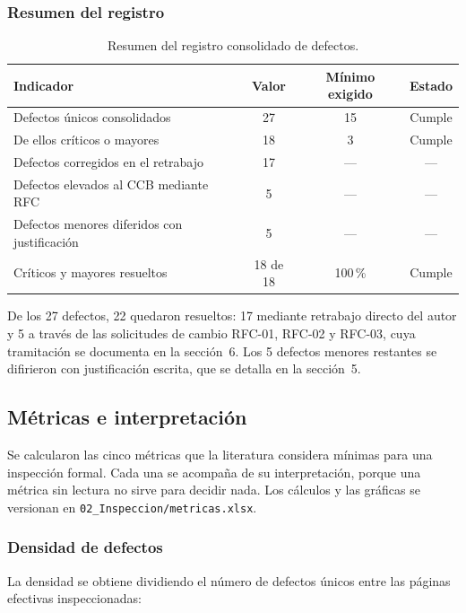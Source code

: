 \documentclass[journal,onecolumn]{IEEEtran}
\begin{document}
	\subsubsection{Resumen del registro}
	
	\begin{table}[h!]
		\centering
		\caption{Resumen del registro consolidado de defectos.}
		\label{tab:resumen-registro}
		\begin{tabular}{
				>{\raggedright\arraybackslash}p{5cm}
				c c c
			}
			\toprule
			\textbf{Indicador} & \textbf{Valor} & \textbf{Mínimo exigido} & \textbf{Estado} \\
			\midrule
			Defectos únicos consolidados & 27 & 15 & Cumple \\
			De ellos críticos o mayores & 18 & 3 & Cumple \\
			Defectos corregidos en el retrabajo & 17 & --- & --- \\
			Defectos elevados al CCB mediante RFC & 5 & --- & --- \\
			Defectos menores diferidos con justificación & 5 & --- & --- \\
			Críticos y mayores resueltos & 18 de 18 & 100\,\% & Cumple \\
			\bottomrule
		\end{tabular}
	\end{table}
	
	De los 27 defectos, 22 quedaron resueltos: 17 mediante retrabajo directo del
	autor y 5 a través de las solicitudes de cambio RFC-01, RFC-02 y RFC-03,
	cuya tramitación se documenta en la sección~6. Los 5 defectos menores
	restantes se difirieron con justificación escrita, que se detalla en la
	sección~5.
	
	\subsection{Métricas e interpretación}
	
	Se calcularon las cinco métricas que la literatura considera mínimas para
	una inspección formal. Cada una se acompaña de su interpretación, porque una
	métrica sin lectura no sirve para decidir nada. Los cálculos y las gráficas
	se versionan en \texttt{02\_Inspeccion/metricas.xlsx}.
	
	\subsubsection{Densidad de defectos}
	
	La densidad se obtiene dividiendo el número de defectos únicos entre las
	páginas efectivas inspeccionadas:
	
\end{document}
